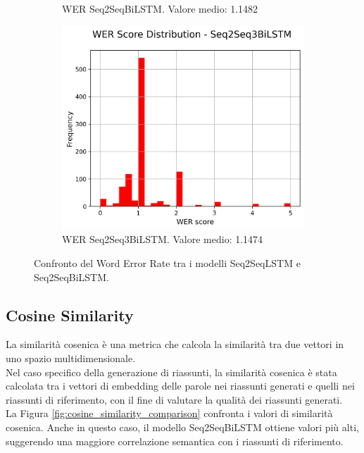 \documentclass[a4paper, 12pt]{article}
\begin{document}
\begin{figure}[H]
\begin{subfigure}{0.45\textwidth}
        \caption{WER Seq2SeqBiLSTM. Valore medio: 1.1482}
    \end{subfigure}
    \begin{subfigure}{0.45\textwidth}
        \centering
        \includegraphics[width=\textwidth]{media/Seq2Seq3BiLSTM_wer_scores.png}
        \caption{WER Seq2Seq3BiLSTM. Valore medio: 1.1474}
    \end{subfigure}
    \caption{Confronto del Word Error Rate tra i modelli Seq2SeqLSTM e Seq2SeqBiLSTM.}
    \label{fig:wer_comparison}
\end{figure}

\subsection{Cosine Similarity}
La similarità cosenica è una metrica che calcola la similarità tra due vettori in uno spazio multidimensionale.\\
Nel caso specifico della generazione di riassunti, la similarità cosenica è stata calcolata tra i vettori di embedding delle parole nei riassunti generati e quelli nei riassunti di riferimento, con il fine di valutare la qualità dei riassunti generati.\\
La Figura \ref{fig:cosine_similarity_comparison} confronta i valori di similarità cosenica. Anche in questo caso, il modello Seq2SeqBiLSTM ottiene valori più alti, suggerendo una maggiore correlazione semantica con i riassunti di riferimento.
\end{document}
